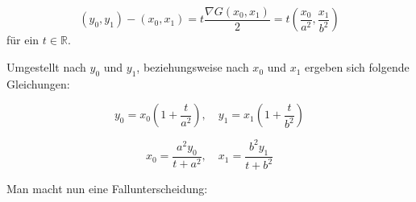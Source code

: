 \begin{equation}
	(y_0,y_1) - (x_0, x_1) = t\frac{\nabla G(x_0,x_1)}{2} = t\left(\frac{x_0}{a^2},\frac{x_1}{b^2}\right)
\end{equation}
für ein $t\in\mathbb{R}$.

Umgestellt nach $y_0$ und $y_1$, beziehungsweise nach $x_0$ und $x_1$ ergeben sich folgende Gleichungen:

\begin{equation}\label{eq:ellipseDistY}
y_0 = x_0\left(1 + \frac{t}{a^2}\right), \quad y_1 = x_1\left(1 + \frac{t}{b^2}\right)
\end{equation}

\begin{equation}\label{eq:ellipseDistX}
x_0 = \frac{a^2y_0}{t+a^2},\quad x_1 = \frac{b^2y_1}{t+b^2}
\end{equation}


\bigskip
Man macht nun eine Fallunterscheidung:

